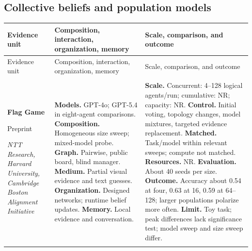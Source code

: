 \subsection{Collective beliefs and population models}
\begingroup
\small
\setlength{\tabcolsep}{5pt}
\renewcommand{\arraystretch}{1.13}
\begin{longtable}{@{}>{\raggedright\arraybackslash}p{}>{\raggedright\arraybackslash}p{}>{\raggedright\arraybackslash}p{}@{}}
\toprule
Evidence unit & Composition, interaction, organization, memory & Scale, comparison, and outcome \\
\midrule
\endfirsthead
\toprule
Evidence unit & Composition, interaction, organization, memory & Scale, comparison, and outcome \\
\midrule
\endhead
\midrule
\multicolumn{3}{r}{Continued on next page}\\
\endfoot
\bottomrule
\endlastfoot
\textbf{Flag Game}\par \citep{flag-game}\par Preprint\par\emph{NTT Research, Harvard University, Cambridge Boston Alignment Initiative} & \textbf{Models.} GPT-4o; GPT-5.4 in eight-agent comparisons. \textbf{Composition.} Homogeneous size sweep; mixed-model probe. \textbf{Graph.} Pairwise, public board, blind manager. \textbf{Medium.} Partial visual evidence and text guesses. \textbf{Organization.} Designed networks; runtime belief updates. \textbf{Memory.} Local evidence and conversation. & \textbf{Scale.} Concurrent: 4--128 logical agents/run; cumulative: NR; capacity: NR. \textbf{Control.} Initial voting, topology changes, model mixtures, targeted evidence replacement. \textbf{Matched.} Task/model within relevant sweeps; compute not matched. \textbf{Resources.} NR. \textbf{Evaluation.} About 40 seeds per size. \textbf{Outcome.} Accuracy about 0.54 at four, 0.63 at 16, 0.59 at 64--128; larger populations polarize more often. \textbf{Limit.} Toy task; peak differences lack significance test; model sweep and size sweep differ. \\ \addlinespace[5pt]

\end{longtable}
